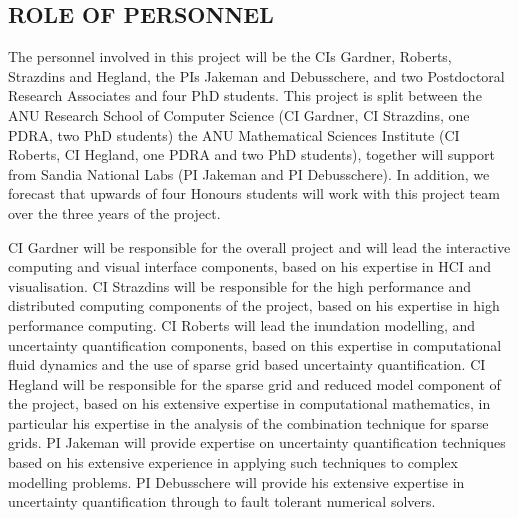 \subsection*{ROLE OF PERSONNEL}

%

The personnel involved in this project will be the CIs Gardner,
Roberts, Strazdins and Hegland, the PIs Jakeman and Debusschere, and
two Postdoctoral Research Associates and four PhD students.  This
project is split between the ANU Research School of Computer Science
(CI Gardner, CI Strazdins, one PDRA, two PhD students) the ANU
Mathematical Sciences Institute (CI Roberts, CI Hegland, one PDRA and
two PhD students), together will support from Sandia National Labs (PI
Jakeman and PI Debusschere).  In addition, we forecast that upwards of
four Honours students will work with this project team over the three
years of the project.

CI Gardner will be responsible for the overall project and will lead
the interactive computing and visual interface components, based on
his expertise in HCI and visualisation.  CI Strazdins will be
responsible for the high performance and distributed computing
components of the project, based on his expertise in high performance
computing.  CI Roberts will lead the inundation modelling, and
uncertainty quantification components, based on this expertise in
computational fluid dynamics and the use of sparse grid based
uncertainty quantification.  CI Hegland will be responsible for the
sparse grid and reduced model component of the project, based on his
extensive expertise in computational mathematics, in particular his
expertise in the analysis of the combination technique for sparse
grids.  PI Jakeman will provide expertise on uncertainty
quantification techniques based on his extensive experience in
applying such techniques to complex modelling problems.  PI
Debusschere will provide his extensive expertise in uncertainty
quantification through to fault tolerant numerical solvers.

